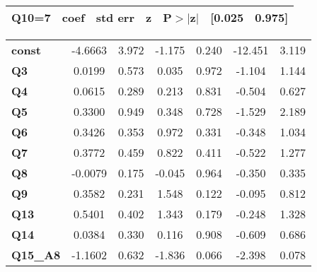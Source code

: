\begin{center}
\begin{tabular}{lcccccc}
\bottomrule
\end{tabular}
\begin{tabular}{ccccccc}
 \textbf{Q10=7}  & \textbf{coef} & \textbf{std err} & \textbf{z} & \textbf{P$> |$z$|$} & \textbf{[0.025} & \textbf{0.975]}  \\
\midrule
\bottomrule
\end{tabular}
\begin{tabular}{lcccccc}
\textbf{const}   &      -4.6663  &        3.972     &    -1.175  &         0.240        &      -12.451    &        3.119     \\
\textbf{Q3}      &       0.0199  &        0.573     &     0.035  &         0.972        &       -1.104    &        1.144     \\
\textbf{Q4}      &       0.0615  &        0.289     &     0.213  &         0.831        &       -0.504    &        0.627     \\
\textbf{Q5}      &       0.3300  &        0.949     &     0.348  &         0.728        &       -1.529    &        2.189     \\
\textbf{Q6}      &       0.3426  &        0.353     &     0.972  &         0.331        &       -0.348    &        1.034     \\
\textbf{Q7}      &       0.3772  &        0.459     &     0.822  &         0.411        &       -0.522    &        1.277     \\
\textbf{Q8}      &      -0.0079  &        0.175     &    -0.045  &         0.964        &       -0.350    &        0.335     \\
\textbf{Q9}      &       0.3582  &        0.231     &     1.548  &         0.122        &       -0.095    &        0.812     \\
\textbf{Q13}     &       0.5401  &        0.402     &     1.343  &         0.179        &       -0.248    &        1.328     \\
\textbf{Q14}     &       0.0384  &        0.330     &     0.116  &         0.908        &       -0.609    &        0.686     \\
\textbf{Q15\_A8} &      -1.1602  &        0.632     &    -1.836  &         0.066        &       -2.398    &        0.078     \\
\bottomrule
\end{tabular}
\end{center}
\newpage
